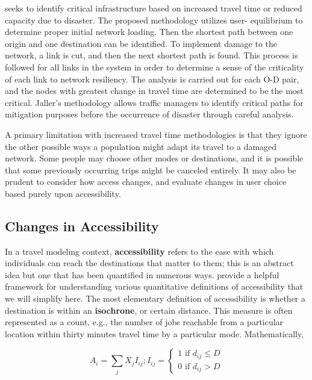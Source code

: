 \citet{jaller2015} seeks to identify critical infrastructure based on
increased travel time or
reduced capacity due to disaster. The proposed methodology utilizes user-
equilibrium to determine
proper initial network loading. Then the shortest path between one origin
and one destination
can be identified. To implement damage to the network, a link is cut, and
then the next shortest
path is found. This process is followed for all links in the system in
order to determine a sense
of the criticality of each link to network resiliency. The analysis is
carried out for each O-D
pair, and the nodes with greatest change in travel time are determined to
be the most critical.
Jaller’s methodology allows traffic managers to identify critical paths
for mitigation purposes
before the occurrence of disaster through careful analysis.

A primary limitation with increased travel time methodologies is that they
ignore the other possible ways a population might adapt its travel to a
damaged
network. Some people may choose other modes or destinations, and it is
possible
that some previously occurring trips might be canceled entirely. It may also be
prudent to consider how access changes, and evaluate changes in user choice
based purely upon accessibility.

\subsection{Changes in Accessibility}
\label{sec:cacc}
In a travel modeling context, \textbf{accessibility} refers to the ease
with which
individuals can reach the destinations that matter to them; this is an
abstract
idea but one that has been quantified in numerous ways. \citet{dong2006}
provide a
helpful framework for understanding various quantitative definitions of
accessibility that we will simplify here. The most elementary definition of
accessibility is whether a destination is within an \textbf{isochrone}, or
certain
distance. This measure is often represented as a count, e.g., the number
of jobs
reachable from a particular location within thirty minutes travel time by a
particular mode. Mathematically,

\begin{equation}
A_i = \sum_{j} X_j I_{ij}; I_{ij} = \begin{cases}  1 \text{ if } d_{ij}
\leq D\\
0 \text{ if } d_{ij} > D \end{cases}
	\label{eqn:isochrone}
\end{equation}

